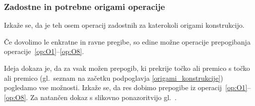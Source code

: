 
\subsubsection{Zadostne in potrebne origami operacije}

Izkaže se, da je teh osem operacij zadostnih za katerokoli origami konstrukcijo.

\begin{izrek}
    \label{izr:op1do8}
    Če dovolimo le enkratne in ravne pregibe, so edine možne operacije prepogibanja operacije~\ref{op:O1}--\ref{op:O8}.
\end{izrek}

Ideja dokaza je, da za vsak možen prepogib, ki prekrije točko ali premico s točko ali premico (gl.\ seznam na začetku podpoglavja \ref{origami_konstrukcije}) pogledamo vse možnosti. Izkaže se, da res dobimo prepogibe iz operacij~\ref{op:O1}--\ref{op:O8}. Za natančen dokaz s slikovno ponazoritvijo gl.\ \cite[str.\ 24--26 (izrek 1.1)]{hull2020}.

